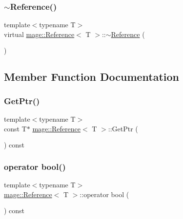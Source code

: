 \subsubsection{\texorpdfstring{$\sim$\+Reference()}{~Reference()}}
{\footnotesize\ttfamily template$<$typename T$>$ \\
virtual \hyperlink{classmage_1_1_reference}{mage\+::\+Reference}$<$ T $>$\+::$\sim$\hyperlink{classmage_1_1_reference}{Reference} (\begin{DoxyParamCaption}{ }\end{DoxyParamCaption})\hspace{0.3cm}{\ttfamily [virtual]}}



\subsection{Member Function Documentation}
\hypertarget{classmage_1_1_reference_a88ee2da25d2ce963e8015080565c9bd1}{}\label{classmage_1_1_reference_a88ee2da25d2ce963e8015080565c9bd1} 
\subsubsection{\texorpdfstring{Get\+Ptr()}{GetPtr()}}
{\footnotesize\ttfamily template$<$typename T$>$ \\
const T$\ast$ \hyperlink{classmage_1_1_reference}{mage\+::\+Reference}$<$ T $>$\+::Get\+Ptr (\begin{DoxyParamCaption}{ }\end{DoxyParamCaption}) const}

\hypertarget{classmage_1_1_reference_ab662fe14ad3fa6a22ba5cc8d51354630}{}\label{classmage_1_1_reference_ab662fe14ad3fa6a22ba5cc8d51354630} 
\subsubsection{\texorpdfstring{operator bool()}{operator bool()}}
{\footnotesize\ttfamily template$<$typename T$>$ \\
\hyperlink{classmage_1_1_reference}{mage\+::\+Reference}$<$ T $>$\+::operator bool (\begin{DoxyParamCaption}{ }\end{DoxyParamCaption}) const}

